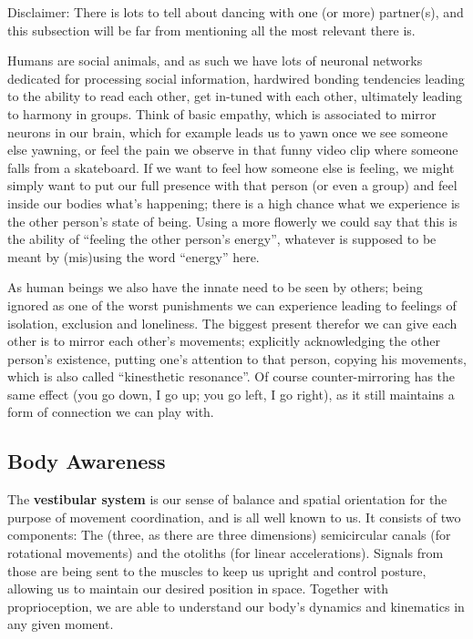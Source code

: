 Disclaimer: There is lots to tell about dancing with one (or more) partner(s), and this subsection will be far from mentioning all the most relevant there is.

Humans are social animals, and as such we have lots of neuronal networks dedicated for processing social information, hardwired bonding tendencies leading to the ability to read each other, get in-tuned with each other, ultimately leading to harmony in groups.
Think of basic empathy, which is associated to mirror neurons in our brain, which for example leads us to yawn once we see someone else yawning, or feel the pain we observe in that funny video clip where someone falls from a skateboard.
If we want to feel how someone else is feeling, we might simply want to put our full presence with that person (or even a group) and feel inside our bodies what's happening; there is a high chance what we experience is the other person's state of being.
Using a more flowerly we could say that this is the ability of ``feeling the other person's energy'', whatever is supposed to be meant by (mis)using the word ``energy'' here.

As human beings we also have the innate need to be seen by others; being ignored as one of the worst punishments we can experience leading to feelings of isolation, exclusion and loneliness.
The biggest present therefor we can give each other is to mirror each other's movements; explicitly acknowledging the other person's existence, putting one's attention to that person, copying his movements, which is also called ``kinesthetic resonance''.
Of course counter-mirroring has the same effect (you go down, I go up; you go left, I go right), as it still maintains a form of connection we can play with.

\subsection{Body Awareness}\label{subsec:body-awareness}

The \textbf{vestibular system} is our sense of balance and spatial orientation for the purpose of movement coordination, and is all well known to us.
It consists of two components: The (three, as there are three dimensions) semicircular canals (for rotational movements) and the otoliths (for linear accelerations).
Signals from those are being sent to the muscles to keep us upright and control posture, allowing us to maintain our desired position in space.
Together with proprioception, we are able to understand our body's dynamics and kinematics in any given moment.

